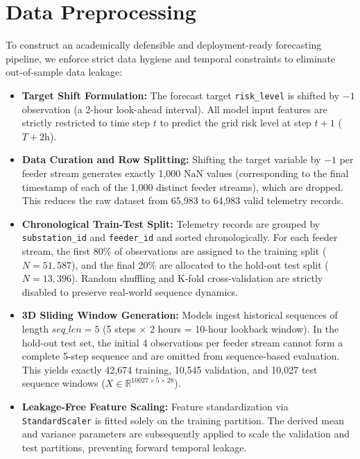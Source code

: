 \section{Data Preprocessing}
To construct an academically defensible and deployment-ready forecasting pipeline, we enforce strict data hygiene and temporal constraints to eliminate out-of-sample data leakage:

\begin{itemize}
    \item \textbf{Target Shift Formulation:} The forecast target \texttt{risk\_level} is shifted by $-1$ observation (a 2-hour look-ahead interval). All model input features are strictly restricted to time step $t$ to predict the grid risk level at step $t+1$ ($T+2\text{h}$).
    \item \textbf{Data Curation and Row Splitting:} Shifting the target variable by $-1$ per feeder stream generates exactly 1,000 NaN values (corresponding to the final timestamp of each of the 1,000 distinct feeder streams), which are dropped. This reduces the raw dataset from 65,983 to 64,983 valid telemetry records.
    \item \textbf{Chronological Train-Test Split:} Telemetry records are grouped by \texttt{substation\_id} and \texttt{feeder\_id} and sorted chronologically. For each feeder stream, the first 80\% of observations are assigned to the training split ($N = 51,587$), and the final 20\% are allocated to the hold-out test split ($N = 13,396$). Random shuffling and K-fold cross-validation are strictly disabled to preserve real-world sequence dynamics.
    \item \textbf{3D Sliding Window Generation:} Models ingest historical sequences of length $seq\_len = 5$ (5 steps $\times$ 2 hours = 10-hour lookback window). In the hold-out test set, the initial 4 observations per feeder stream cannot form a complete 5-step sequence and are omitted from sequence-based evaluation. This yields exactly 42,674 training, 10,545 validation, and 10,027 test sequence windows ($X \in \mathbb{R}^{10027 \times 5 \times 28}$).
    \item \textbf{Leakage-Free Feature Scaling:} Feature standardization via \texttt{StandardScaler} is fitted solely on the training partition. The derived mean and variance parameters are subsequently applied to scale the validation and test partitions, preventing forward temporal leakage.
\end{itemize}
